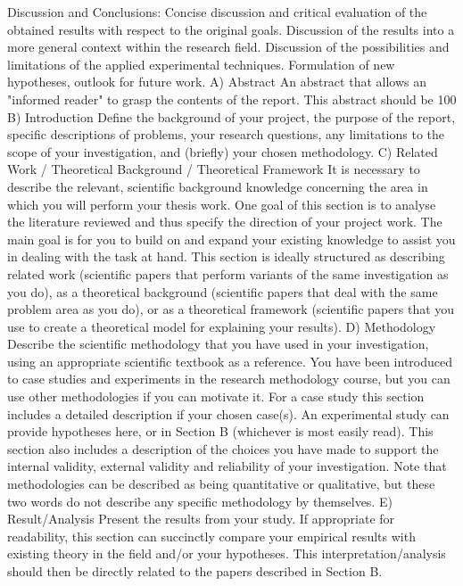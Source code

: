 Discussion and Conclusions: Concise discussion and critical evaluation of the obtained results with respect to the original goals. Discussion of the results into a more general context within the research field. Discussion of the possibilities and limitations of the applied experimental techniques. Formulation of new hypotheses, outlook for future work.
A) Abstract
An abstract that allows an "informed reader" to grasp the contents of the report. This abstract should be 100%
B) Introduction
Define the background of your project, the purpose of the report, specific descriptions of problems, your research questions, any limitations to the scope of your investigation, and (briefly) your chosen methodology.
C) Related Work / Theoretical Background / Theoretical Framework
It is necessary to describe the relevant, scientific background knowledge concerning the area in which you will perform your thesis work. One goal of this section is to analyse the literature reviewed and thus specify the direction of your project work. The main goal is for you to build on and expand your existing knowledge to assist you in dealing with the task at hand. This section is ideally structured as describing related work (scientific papers that perform variants of the same investigation as you do), as a theoretical background (scientific papers that deal with the same problem area as you do), or as a theoretical framework (scientific papers that you use to create a theoretical model for explaining your results).
D) Methodology
Describe the scientific methodology that you have used in your investigation, using an appropriate scientific textbook as a reference. You have been introduced to case studies and experiments in the research methodology course, but you can use other methodologies if you can motivate it. For a case study this section includes a detailed description if your chosen case(s). An experimental study can provide hypotheses here, or in Section B (whichever is most easily read). This section also includes a description of the choices you have made to support the internal validity, external validity and reliability of your investigation.
Note that methodologies can be described as being quantitative or qualitative, but these two words do not describe any specific methodology by themselves.
E) Result/Analysis
Present the results from your study. If appropriate for readability, this section can succinctly compare your empirical results with existing theory in the field and/or your hypotheses. This interpretation/analysis should then be directly related to the papers described in Section B.
